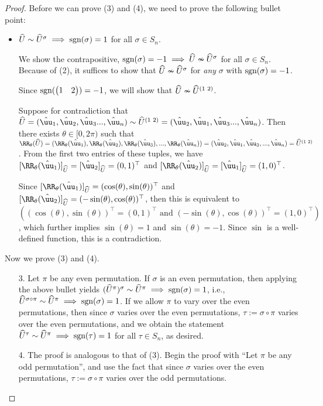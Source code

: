 \begin{proof}
    Before we can prove (3) and (4), we need to prove the following bullet point:

    \begin{itemize}
        \item $\widehat{U} \sim \widehat{U}^\sigma \implies \text{sgn}(\sigma) = 1$ for all $\sigma \in S_n$.

        We show the contrapositive, $\text{sgn}(\sigma) = -1 \implies \widehat{U} \nsim \widehat{U}^\sigma$ for all $\sigma \in S_n$. Because of (2), it suffices to show that $\widehat{U} \nsim \widehat{U}^\sigma$ for \textit{any} $\sigma$ with $\text{sgn}(\sigma) = -1$.

        Since $\text{sgn}(\begin{pmatrix} 1 & 2 \end{pmatrix}) = -1$, we will show that $\widehat{U} \nsim \widehat{U}^{(1 \text{ } 2)}$.
            
        Suppose for contradiction that $\hU = (\huu_1, \huu_2, \huu_3 ..., \huu_n) \sim \hU^{(1 \spc 2)} = (\huu_2, \huu_1, \huu_3 ..., \huu_n)$. Then there exists $\theta \in [0, 2\pi)$ such that ${\RR_\theta(\hU) = (\RR_\theta(\huu_1), \RR_\theta(\huu_2), \RR_\theta(\huu_3), ..., \RR_\theta(\huu_n)) = (\huu_2, \huu_1, \huu_3, ..., \huu_n) = \hU^{(1 \spc 2)}}$. From the first two entries of these tuples, we have $[\RR_\theta(\huu_1)]_{\hU} = [\huu_2]_{\hU} = (0, 1)^\top$ and $[\RR_\theta(\huu_2)]_{\hU} = [\huu_1]_{\hU} = (1, 0)^\top$.
            
        Since $[\RR_\theta(\huu_1)]_{\hU} = (\cos(\theta), \sin(\theta))^\top$ and ${[\RR_\theta(\huu_2)]_{\hU} = (-\sin(\theta), \cos(\theta))^\top}$, then this is equivalent to $((\cos(\theta), \sin(\theta))^\top = (0, 1)^\top \text{ and } (-\sin(\theta), \cos(\theta))^\top = (1, 0)^\top)$, which further implies $\sin(\theta) = 1$ and $\sin(\theta) = -1$. Since $\sin$ is a well-defined function, this is a contradiction.
    \end{itemize}

    Now we prove (3) and (4).
    
    \begin{enumerate}
        \item[3.] Let $\pi$ be any even permutation. If $\sigma$ is an even permutation, then applying the above bullet yields $(\widehat{U}^\pi)^\sigma \sim \widehat{U}^\pi \implies \text{sgn}(\sigma) = 1$, i.e., $\widehat{U}^{\sigma \circ \pi} \sim \widehat{U}^\pi \implies \text{sgn}(\sigma) = 1$. If we allow $\pi$ to vary over the even permutations, then since $\sigma$ varies over the even permutations, $\tau := \sigma \circ \pi$ varies over the even permutations, and we obtain the statement $\widehat{U}^\tau \sim \widehat{U}^\pi \implies \text{sgn}(\tau) = 1$ for all $\tau \in S_n$, as desired.
        \item[4.] The proof is analogous to that of (3). Begin the proof with ``Let $\pi$ be any odd permutation'', and use the fact that since $\sigma$ varies over the even permutations, $\tau := \sigma \circ \pi$ varies over the odd permutations.
    \end{enumerate}
\end{proof}

